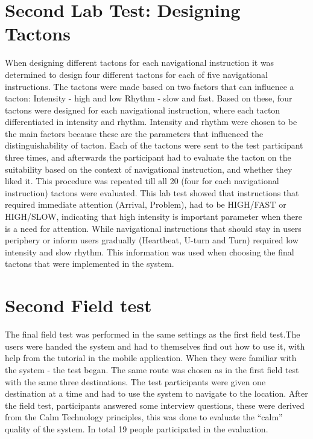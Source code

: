 \documentclass{sigchi}
\begin{document}
\section{Second Lab Test: Designing Tactons}
When designing different tactons for each navigational instruction it was determined to design four different tactons for each of five navigational instructions. The tactons were made based on two factors that can influence a tacton:\newline
Intensity - high and low 
Rhythm - slow and fast.
Based on these, four tactons were designed for each navigational instruction, where each tacton differentiated in intensity and rhythm. Intensity and rhythm were chosen to be the main factors because these are the parameters that influenced the distinguishability of tacton. 
\newline
\newline
Each of the tactons were sent to the test participant three times, and afterwards the participant had to evaluate the tacton on the suitability based on the context of navigational instruction, and whether they liked it. This procedure was repeated till all 20 (four for each navigational instruction) tactons were evaluated.
\newline
\newline
This lab test showed that instructions that required immediate attention (Arrival, Problem), had to be HIGH/FAST or HIGH/SLOW, indicating that high intensity is important parameter when there is a need for attention. 
While navigational instructions that should stay in users periphery or inform users gradually (Heartbeat, U-turn and Turn) required low intensity and slow rhythm. This information was used when choosing the final tactons that were implemented in the system.  
\section{Second Field test}
The final field test was performed in the same settings as the first field test.The users were handed the system and had to themselves find out how to use it, with help from the tutorial in the mobile application. When they were familiar with the system - the test began. The same route was chosen as in the first field test with the same three destinations. 
\newline
\newline
The test participants were given one destination at a time and had to use the system to navigate to the location. After the field test, participants answered some interview questions, these were derived from the Calm Technology principles, this was done to evaluate the “calm” quality of the system. In total 19 people participated in the evaluation.
\end{document}
